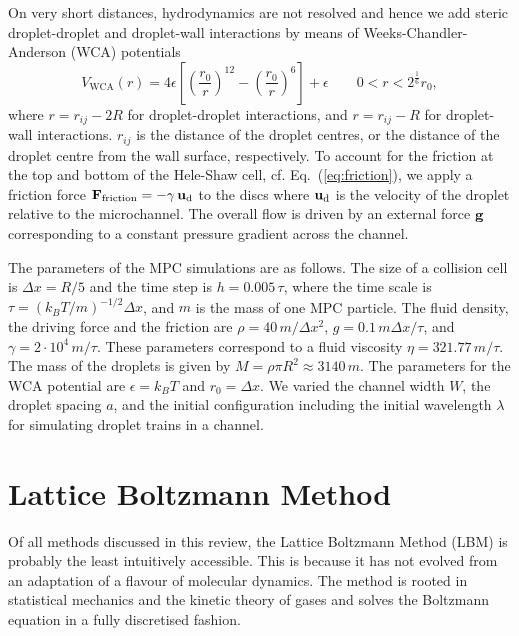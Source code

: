 \documentclass[8.5pt,twoside,twocolumn]{article}
\renewcommand{\vec}[1]{{\ensuremath{\mathchoice
                     {\mbox{\boldmath$\displaystyle\mathbf{#1}$}}
                     {\mbox{\boldmath$\textstyle\mathbf{#1}$}}
                     {\mbox{\boldmath$\scriptstyle\mathbf{#1}$}}
                     {\mbox{\boldmath$\scriptscriptstyle\mathbf{#1}$}}}}}%
\begin{document}
On very short distances, hydrodynamics are not resolved and hence we
add steric droplet-droplet and droplet-wall interactions by means of
Weeks-Chandler-Anderson (WCA) potentials
%
\begin{equation}
V_\text{WCA}(r) =
4\epsilon \left[ \left( \frac{r_0}{r} \right)^{12} - \left(
\frac{r_0}{r} \right)^6 \right] + \epsilon \qquad 0 < r < 2^{\frac{1}{6}} r_0 ,
\end{equation}
%
where $r = r_{ij} - 2R$ for droplet-droplet interactions, and $r =
r_{ij} - R$ for droplet-wall interactions. $r_{ij}$ is the distance of
the droplet centres, or the distance of the droplet centre from the
wall surface, respectively. To account for the friction at the top and
bottom of the Hele-Shaw cell, cf. Eq.~(\ref{eq:friction}), we apply a
friction force $\vec{F}_\text{friction} = -\gamma \, \vec{u}_\text{d}$ to
the discs where $\vec{u}_\text{d}$ is the velocity of the droplet
relative to the microchannel. The overall flow is driven by an
external force $\vec{g}$ corresponding to a constant pressure gradient
across the channel.

The parameters of the MPC simulations are as follows. The size of a
collision cell is $\Delta x=R/5$ and the time step is $h =
0.005\,\tau$, where the time scale is $\tau=(k_BT/m)^{-1/2} \Delta x$,
and $m$ is the mass of one MPC particle. The fluid density, the
driving force and the friction are $\rho=40\,m/\Delta x^2$, $g=0.1\,m
\Delta x/\tau$, and $\gamma=2 \cdot 10^4\,m/\tau$. These parameters
correspond to a fluid viscosity $\eta=321.77\,m/\tau$. The mass of the
droplets is given by $M=\rho\pi R^2\approx3140\,m$. The parameters for
the WCA potential are $\epsilon=k_BT$ and $r_0=\Delta x$. We varied
the channel width $W$, the droplet spacing $a$, and the initial
configuration including the initial wavelength $\lambda$ for
simulating droplet trains in a channel.


\section{Lattice Boltzmann Method}

Of all methods discussed in this review, the Lattice Boltzmann Method (LBM) \cite{Succi:2001, Guo:2013} 
is probably the least intuitively accessible. 
This is because it has not evolved from an adaptation of a flavour of molecular dynamics. 
The method is rooted in statistical mechanics and the kinetic theory of gases and solves the Boltzmann equation
in a fully discretised fashion.
\end{document}
